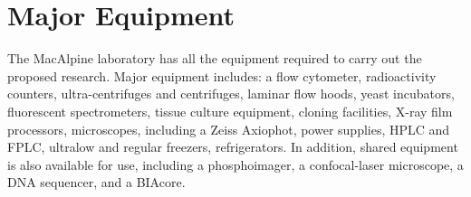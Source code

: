 \section*{Major Equipment}
 The MacAlpine laboratory has all the equipment required to carry out the proposed research.  Major equipment includes: a flow cytometer, radioactivity counters, ultra-centrifuges and centrifuges, laminar flow hoods, yeast incubators, fluorescent spectrometers, tissue culture equipment, cloning facilities, X-ray film processors, microscopes, including a Zeiss Axiophot, power supplies, HPLC and FPLC, ultralow and regular freezers, refrigerators.  In addition, shared equipment is also available for use, including a phosphoimager, a confocal-laser microscope, a DNA sequencer, and a BIAcore.